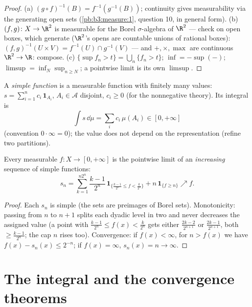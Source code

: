 \begin{proof}
(a) $(g\circ f)^{-1}(B) = f^{-1}(g^{-1}(B))$; continuity gives
measurability via the generating open sets
(\cref{pb:b3:measure:1}, question 10, in general form).
(b) $(f, g) \colon X \to \R^2$ is measurable for the Borel
$\sigma$-algebra of $\R^2$ --- check on open boxes, which
generate ($\R^2$'s opens are countable unions of rational
boxes): $(f,g)^{-1}(U\times V) = f^{-1}(U)\cap g^{-1}(V)$ ---
and $+, \times, \max$ are continuous $\R^2 \to \R$: compose.
(c) $\{\sup f_n > t\} = \bigcup_n\{f_n > t\}$; $\inf = -\sup(-)$;
$\limsup = \inf_N\sup_{n \geq N}$; a pointwise limit is its own
$\limsup$.
\end{proof}

\begin{definition}\label{def:b3:lebesgue:simple}
A \emph{simple function} is a measurable
function with finitely many values: $s = \sum_{i=1}^n
c_i\,\mathbf 1_{A_i}$, $A_i \in \mathcal A$ disjoint, $c_i \geq
0$ (for the nonnegative theory). Its integral is
\[
\int s\,\dd\mu = \sum_i c_i\,\mu(A_i) \in [0, +\infty]
\]
(convention $0\cdot\infty = 0$); the value does not depend on
the representation (refine two partitions).
\end{definition}

\begin{theorem}
\label{thm:b3:lebesgue:approximation}
Every measurable $f \colon X \to [0, +\infty]$ is the pointwise
limit of an \emph{increasing} sequence of simple functions:
\[
s_n = \sum_{k=1}^{n2^n} \frac{k-1}{2^n}\,
\mathbf 1_{\{\frac{k-1}{2^n} \leq f < \frac k{2^n}\}}
+ n\,\mathbf 1_{\{f \geq n\}} \nearrow f .
\]
\end{theorem}

\begin{proof}
Each $s_n$ is simple (the sets are preimages of Borel sets).
Monotonicity: passing from $n$ to $n+1$ splits each dyadic
level in two and never decreases the assigned value (a point
with $\frac{k-1}{2^n} \leq f(x) < \frac k{2^n}$ gets either
$\frac{2k-2}{2^{n+1}}$ or $\frac{2k-1}{2^{n+1}}$, both $\geq
\frac{k-1}{2^n}$; the cap $n$ rises too). Convergence: if
$f(x) < \infty$, for $n > f(x)$ we have $f(x) - s_n(x) \leq
2^{-n}$; if $f(x) = \infty$, $s_n(x) = n \to \infty$.
\end{proof}

\section{The integral and the convergence theorems}

